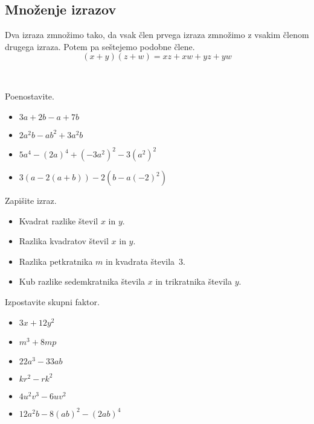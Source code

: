     
            \subsection{Množenje izrazov}
                Dva izraza zmnožimo tako, da vsak člen prvega izraza zmnožimo z vsakim členom drugega izraza. Potem pa seštejemo podobne člene.
                $$(x+y)(z+w)=xz+xw+yz+yw $$
            
        ~
    
        \begin{multicols}{2}
            

            \begin{naloga}
                Poenostavite.
                \begin{itemize}
                    \item $3a+2b-a+7b$ 
                    \item $2a^2b-ab^2+3a^2b$ 
                    \item $5a^4-(2a)^4+(-3a^2)^2-3(a^2)^2$ 
                    \item $3(a-2(a+b))-2(b-a(-2)^2)$ 
                \end{itemize}
            \end{naloga}
        
    
        
            \begin{naloga}
                Zapišite izraz.
                \begin{itemize}
                    \item Kvadrat razlike števil $x$ in $y$. 
                    \item Razlika kvadratov števil $x$ in $y$. 
                    \item Razlika petkratnika $m$ in kvadrata števila~$3$. 
                    \item Kub razlike sedemkratnika števila $x$ in trikratnika števila $y$. 
                \end{itemize}
            \end{naloga}
        
    
        
            \begin{naloga}
                Izpostavite skupni faktor.
                \begin{itemize}
                    \item $3x+12y^2$ 
                    \item $m^3+8mp$ 
                    \item $22a^3-33ab$ 
                    \item $kr^2-rk^2$ 
                    \item $4u^2v^3-6uv^2$ 
                    \item $12a^2b-8(ab)^2-(2ab)^4$ 
                \end{itemize}
            \end{naloga}
        

\end{multicols}
